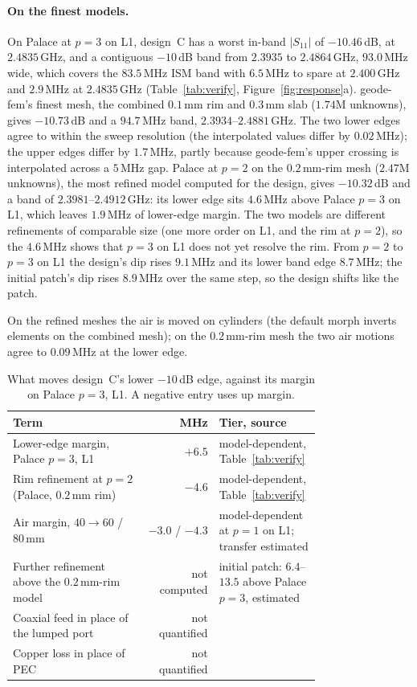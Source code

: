 \documentclass{anvil-paper}
\begin{document}
\paragraph{On the finest models.}
On Palace at $p = 3$ on L1, design~C has a worst in-band $|S_{11}|$ of
$-10.46$\,dB, at $2.4835$\,GHz, and a contiguous $-10$\,dB band from
$2.3935$ to $2.4864$\,GHz, $93.0$\,MHz wide, which covers the $83.5$\,MHz ISM
band with $6.5$\,MHz to spare at $2.400$\,GHz and $2.9$\,MHz at $2.4835$\,GHz
(Table~\ref{tab:verify}, Figure~\ref{fig:response}a). geode-fem's finest
mesh, the combined $0.1$\,mm rim and $0.3$\,mm slab ($1.74$M unknowns),
gives $-10.73$\,dB and a $94.7$\,MHz band, $2.3934$--$2.4881$\,GHz. The two
lower edges agree to within the sweep resolution (the interpolated values
differ by $0.02$\,MHz); the upper edges differ by $1.7$\,MHz, partly
because geode-fem's upper crossing is interpolated across a $5$\,MHz gap. Palace at $p = 2$ on the $0.2$\,mm-rim mesh ($2.47$M unknowns), the
most refined model computed for the design, gives $-10.32$\,dB and a band
of $2.3981$--$2.4912$\,GHz: its lower edge sits $4.6$\,MHz above Palace
$p = 3$ on L1, which leaves $1.9$\,MHz of lower-edge margin. The two models
are different refinements of comparable size (one more order on L1, and the
rim at $p = 2$), so the $4.6$\,MHz shows that $p = 3$ on L1 does not yet
resolve the rim. From $p = 2$ to $p = 3$ on L1 the design's dip rises
$9.1$\,MHz and its lower band edge $8.7$\,MHz; the initial patch's dip rises
$8.9$\,MHz over the same step, so the design shifts like the patch.

On the refined meshes the air is moved on cylinders (the default morph
inverts elements on the combined mesh); on the $0.2$\,mm-rim mesh the two
air motions agree to $0.09$\,MHz at the lower edge.

\begin{table}[t]
  \centering
  \caption{What moves design~C's lower $-10$\,dB edge, against its margin on
  Palace $p = 3$, L1. A negative entry uses up margin.}
  \label{tab:budget}
  \small
  \begin{tabular}{@{}>{\raggedright\arraybackslash}p{0.43\linewidth} r >{\raggedright\arraybackslash}p{0.33\linewidth}@{}}
    \toprule
    Term & MHz & Tier, source \\
    \midrule
    Lower-edge margin, Palace $p = 3$, L1 & $+6.5$ & model-dependent, Table~\ref{tab:verify} \\
    Rim refinement at $p = 2$ (Palace, $0.2$\,mm rim) & $-4.6$ & model-dependent, Table~\ref{tab:verify} \\
    Air margin, $40 \to 60$ / $80$\,mm & $-3.0$ / $-4.3$ & model-dependent at $p = 1$ on L1; transfer estimated \\
    Further refinement above the $0.2$\,mm-rim model & not computed & initial patch: $6.4$--$13.5$ above Palace $p = 3$, estimated \\
    Coaxial feed in place of the lumped port & not quantified & \\
    Copper loss in place of PEC & not quantified & \\
    \bottomrule
  \end{tabular}
\end{table}
\end{document}
